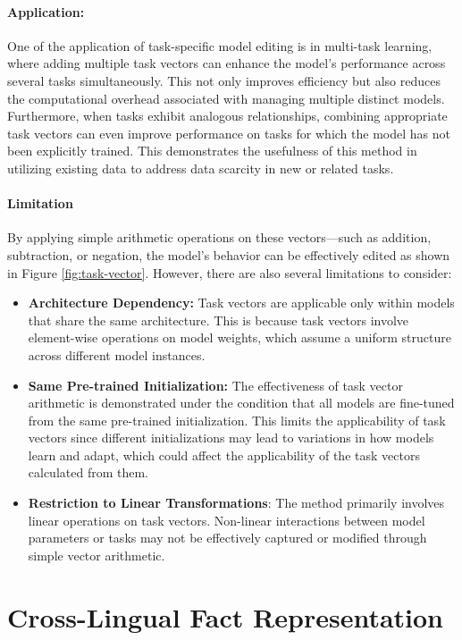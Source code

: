\paragraph{Application:} One of the application of task-specific model editing is in multi-task learning, where adding multiple task vectors can enhance the model’s performance across several tasks simultaneously. This not only improves efficiency but also reduces the computational overhead associated with managing multiple distinct models. Furthermore, when tasks exhibit analogous relationships, combining appropriate task vectors can even improve performance on tasks for which the model has not been explicitly trained. This demonstrates the usefulness of this method in utilizing existing data to address data scarcity in new or related tasks.

\paragraph{Limitation} By applying simple arithmetic operations on these vectors—such as addition, subtraction, or negation, the model's behavior can be effectively edited as shown in Figure \ref{fig:task-vector}. However, there are also several limitations to consider:
\begin{itemize}
	\item \textbf{Architecture Dependency:} Task vectors are applicable only within models that share the same architecture. This is because task vectors involve element-wise operations on model weights, which assume a uniform structure across different model instances.
	\item \textbf{Same Pre-trained Initialization:} The effectiveness of task vector arithmetic is demonstrated under the condition that all models are fine-tuned from the same pre-trained initialization. This limits the applicability of task vectors since different initializations may lead to variations in how models learn and adapt, which could affect the applicability of the task vectors calculated from them.
	\item \textbf{Restriction to Linear Transformations}: The method primarily involves linear operations on task vectors. Non-linear interactions between model parameters or tasks may not be effectively captured or modified through simple vector arithmetic.
\end{itemize}

\section{Cross-Lingual Fact Representation}

